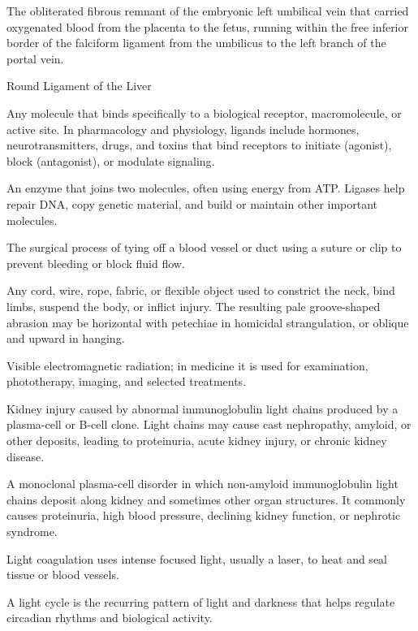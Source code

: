  The obliterated fibrous remnant of the embryonic left umbilical vein that carried oxygenated blood from the placenta to the fetus, running within the free inferior border of the falciform ligament from the umbilicus to the left branch of the portal vein.

\synonyms
Round Ligament of the Liver

 Any molecule that binds specifically to a biological receptor, macromolecule, or active
site. In pharmacology and physiology, ligands include hormones, neurotransmitters,
drugs, and toxins that bind receptors to initiate (agonist), block (antagonist), or
modulate signaling.

 An enzyme that joins two molecules, often using energy from ATP. Ligases help repair DNA, copy genetic material, and build or maintain other important molecules.

 The surgical process of tying off a blood vessel or duct using a suture or clip to
prevent bleeding or block fluid flow.

 Any cord, wire, rope, fabric, or flexible object used to constrict the neck, bind limbs,
suspend the body, or inflict injury. The resulting pale groove-shaped abrasion may be
horizontal with petechiae in homicidal strangulation, or oblique and upward in hanging.

 Visible electromagnetic radiation; in medicine it is used for examination, phototherapy, imaging, and selected treatments.

 Kidney injury caused by abnormal immunoglobulin light chains produced by a plasma-cell or B-cell clone. Light chains may cause cast nephropathy, amyloid, or other deposits, leading to proteinuria, acute kidney injury, or chronic kidney disease.

 A monoclonal plasma-cell disorder in which non-amyloid immunoglobulin light chains deposit along kidney and sometimes other organ structures. It commonly causes proteinuria, high blood pressure, declining kidney function, or nephrotic syndrome.

 Light coagulation uses intense focused light, usually a laser, to heat and seal tissue or blood vessels.

 A light cycle is the recurring pattern of light and darkness that helps regulate circadian rhythms and biological activity.

